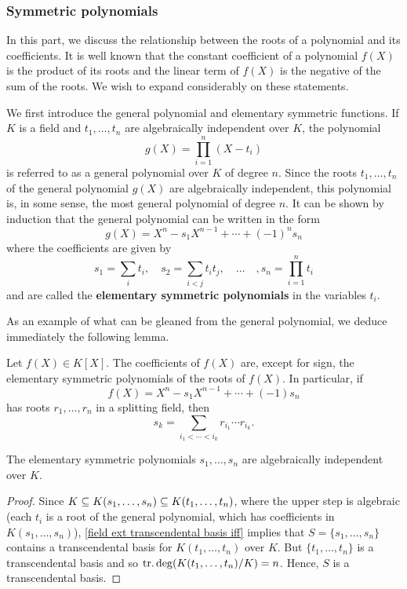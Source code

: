 \subsubsection{Symmetric polynomials}
In this part, we discuss the relationship between the roots of a polynomial and its coefficients. It is well known that the constant coefficient of a polynomial $f(X)$ is the product of its roots and the linear term of $f(X)$ is the negative of the sum of the roots. We wish to expand considerably on these statements.\par
We first introduce the general polynomial and elementary symmetric functions. If $K$ is a field and $t_1,\dots,t_n$ are algebraically independent over $K$, the polynomial
\[g(X)=\prod_{i=1}^{n}(X-t_i)\]
is referred to as a general polynomial over $K$ of degree $n$. Since the roots $t_1,\dots,t_n$ of the general polynomial $g(X)$ are algebraically independent, this polynomial is, in some sense, the most general polynomial of degree $n$. It can be shown by induction that the general polynomial can be written in the form
\[g(X)=X^n-s_1X^{n-1}+\cdots+(-1)^ns_n\]
where the coefficients are given by
\[s_1=\sum_it_i,\quad s_2=\sum_{i<j}t_it_j,\quad\dots\quad,s_n=\prod_{i=1}^{n}t_i\]
and are called the \textbf{elementary symmetric polynomials} in the variables $t_i$.\par
As an example of what can be gleaned from the general polynomial, we deduce immediately the following lemma.
\begin{lemma}\label{polynomial coefficient in roots}
Let $f(X)\in K[X]$. The coefficients of $f(X)$ are, except for sign, the elementary symmetric polynomials of the roots of $f(X)$. In particular, if
\[f(X)=X^n-s_1X^{n-1}+\cdots+(-1)s_n\]
has roots $r_1,\dots,r_n$ in a splitting field, then
\[s_k=\sum_{i_1<\cdots<i_k}r_{i_1}\cdots r_{i_k}.\]
\end{lemma}
\begin{proposition}
The elementary symmetric polynomials $s_1,\dots,s_n$ are algebraically independent over $K$.
\end{proposition}
\begin{proof}
Since $K\subseteq K(s_1,\dots,s_n)\subseteq K(t_1,\dots,t_n)$, where the upper step is algebraic (each $t_i$ is a root of the general polynomial, which has coefficients in $K(s_1,\dots,s_n)$), \cref{field ext transcendental basis iff} implies that $S=\{s_1,\dots,s_n\}$ contains a transcendental basis for $K(t_1,\dots,t_n)$ over $K$. But $\{t_1,\dots,t_n\}$ is a transcendental basis and so $\mathrm{tr}.\deg(K(t_1,\dots,t_n)/K)=n$. Hence, $S$ is a transcendental basis.
\end{proof}
